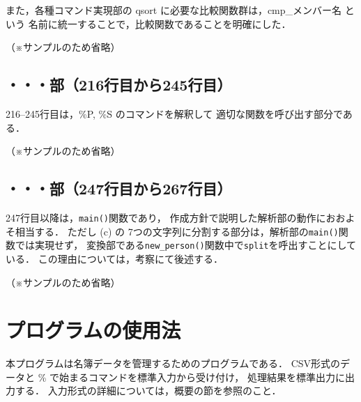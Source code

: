 \documentclass[a4j,11pt]{jarticle}
\begin{document}
また，各種コマンド実現部の qsort に必要な比較関数群は，cmp\_メンバー名 という
名前に統一することで，比較関数であることを明確にした．

（※サンプルのため省略）

\subsection{・・・部（216行目から245行目）}

216--245行目は，\%P, \%S のコマンドを解釈して
適切な関数を呼び出す部分である．

（※サンプルのため省略）

\subsection{・・・部（247行目から267行目）}

247行目以降は，\verb|main()|関数であり，
作成方針で説明した解析部の動作におおよそ相当する．
ただし (c) の 7つの文字列に分割する部分は，解析部の\verb|main()|関数では実現せず，
変換部である\verb|new_person()|関数中で\verb|split|を呼出すことにしている．
この理由については，考察にて後述する．

（※サンプルのため省略）

\section{プログラムの使用法}


本プログラムは名簿データを管理するためのプログラムである．
CSV形式のデータと \% で始まるコマンドを標準入力から受け付け，
処理結果を標準出力に出力する．
入力形式の詳細については，概要の節を参照のこと．
\end{document}
